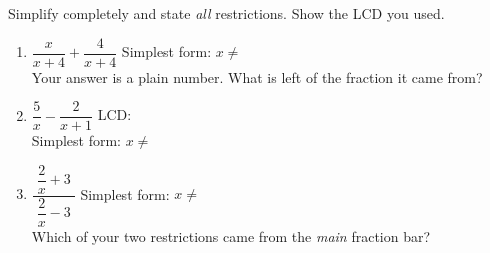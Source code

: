 \documentclass[10pt]{article}
\begin{document}
\begin{practicebox}
Simplify completely and state \emph{all} restrictions. Show the LCD you used.

\vspace{3pt}
\begin{enumerate}[leftmargin=1.7em, itemsep=8pt]
  \item $\dfrac{x}{x+4}+\dfrac{4}{x+4}$ \hfill Simplest form:  \quad
        $x\neq$  \\[3pt]
        Your answer is a plain number. What is left of the fraction it came from? 
  \item $\dfrac{5}{x}-\dfrac{2}{x+1}$ \hfill LCD:  \\[4pt]
        Simplest form:  \quad $x\neq$ 
  \item $\dfrac{\;\dfrac{2}{x}+3\;}{\;\dfrac{2}{x}-3\;}$ \hfill Simplest form:  \quad
        $x\neq$  \\[3pt]
        Which of your two restrictions came from the \emph{main} fraction bar? 
\end{enumerate}
\end{practicebox}
\end{document}
